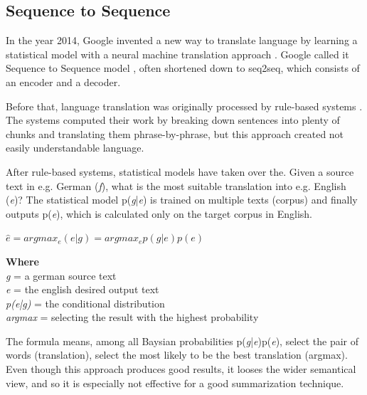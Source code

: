 \subsection{Sequence to Sequence}\label{ss:seq2seq}
In the year 2014, Google invented a new way to translate language by learning a statistical model with a neural machine translation approach \cite{seq2seq}. Google called it Sequence to Sequence model \cite{seq2seq}, often shortened down to seq2seq, which consists of an encoder and a decoder. 

Before that, language translation was originally processed by rule-based systems \cite{chen-goodman}. The systems computed their work by breaking down sentences into plenty of chunks and translating them phrase-by-phrase, but this approach created not easily understandable language.

After rule-based systems, statistical models have taken over the. Given a source text in e.g. German (\textit{f}), what is the most suitable translation into e.g. English (\textit{e})? The statistical model p(\textit{g}|\textit{e}) is trained on multiple texts (corpus) and finally outputs p(\textit{e}), which is calculated only on the target corpus in English. 

\begin{tcolorbox}
	\begin{center}
		\begin{math}
		\hat{e} = argmax_{e}(e|g) = argmax_{e} p(g|e) p(e)
		\label{eq:rule}
		\end{math}
	\end{center}
\end{tcolorbox}

\begin{tcolorbox}
	\textbf{Where} \\
	\textit{g} = a german source text \\
	\textit{e} = the english desired output text \\
	\textit{p(e|g)} = the conditional distribution \\
	\textit{argmax} = selecting the result with the highest probability
\end{tcolorbox}

The formula means, among all Baysian probabilities p(\textit{g}|\textit{e})p(\textit{e}), select the pair of words (translation), select the most likely to be the best translation (argmax). Even though this approach produces good results, it looses the wider semantical view, and so it is especially not effective for a good summarization technique.

